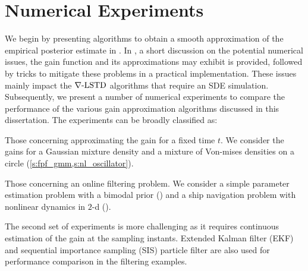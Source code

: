 \section{Numerical Experiments}
\label{s:fpf_numerics}
We begin by presenting algorithms to obtain a smooth approximation of the empirical posterior estimate in . In , a short discussion on the potential numerical issues, the gain function and its approximations may exhibit is provided, followed by tricks to mitigate these problems in a practical implementation. These issues mainly impact the $\nabla\text{-LSTD}$ algorithms that require an SDE simulation. Subsequently, we present a number of numerical experiments to compare the performance of the various gain approximation algorithms discussed in this dissertation. The experiments can be broadly classified as:
\begin{arabnum}
 \item Those concerning approximating the gain for a fixed time $t$. We consider the gains for a Gaussian mixture density and a mixture of Von-mises densities on a circle (\cref{s:fpf_gmm,s:nl_oscillator}).  
 \item Those concerning an online filtering problem. We consider a simple parameter estimation problem with a bimodal prior () and a ship navigation problem with nonlinear dynamics in $2$-d ().
\end{arabnum}
The second set of experiments is more challenging as it requires continuous estimation of the gain at the sampling instants. Extended Kalman filter (EKF) and sequential importance sampling (SIS) particle filter are also used for performance comparison in the filtering examples.  
